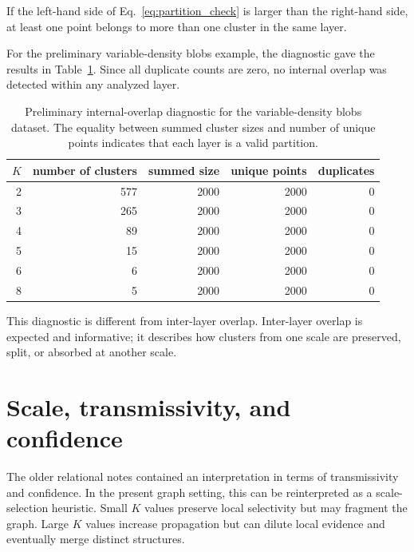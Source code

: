 \documentclass[pdflatex,sn-mathphys-num]{sn-jnl}
\begin{document}
If the left-hand side of Eq.~\eqref{eq:partition_check} is larger than the right-hand side, at least one point belongs to more than one cluster in the same layer.

For the preliminary variable-density blobs example, the diagnostic gave the results in Table~\ref{tab:partition_diagnostic}. Since all duplicate counts are zero, no internal overlap was detected within any analyzed layer.

\begin{table}[t]
\caption{Preliminary internal-overlap diagnostic for the variable-density blobs dataset. The equality between summed cluster sizes and number of unique points indicates that each layer is a valid partition.}\label{tab:partition_diagnostic}
\centering
\begin{tabular}{rrrrr}
\toprule
$K$ & number of clusters & summed size & unique points & duplicates\\
\midrule
2 & 577 & 2000 & 2000 & 0\\
3 & 265 & 2000 & 2000 & 0\\
4 & 89  & 2000 & 2000 & 0\\
5 & 15  & 2000 & 2000 & 0\\
6 & 6   & 2000 & 2000 & 0\\
8 & 5   & 2000 & 2000 & 0\\
\bottomrule
\end{tabular}
\end{table}

This diagnostic is different from inter-layer overlap. Inter-layer overlap is expected and informative; it describes how clusters from one scale are preserved, split, or absorbed at another scale.

\section{Scale, transmissivity, and confidence}\label{sec:scale}

The older relational notes contained an interpretation in terms of transmissivity and confidence. In the present graph setting, this can be reinterpreted as a scale-selection heuristic. Small $K$ values preserve local selectivity but may fragment the graph. Large $K$ values increase propagation but can dilute local evidence and eventually merge distinct structures.
\end{document}
